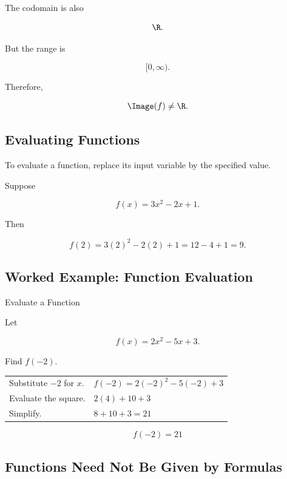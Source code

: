 The codomain is also

\[ \R. \]

But the range is

\[ [0,\infty). \]

Therefore,

\[ \Image(f)\neq\R. \]

\subsection{Evaluating Functions}
\label{subsec:evaluating-functions}

To evaluate a function, replace its input variable by the specified value.

Suppose

\[ f(x)=3x^2-2x+1. \]

Then

\[ f(2)=3(2)^2-2(2)+1=12-4+1=9. \]

\subsection{Worked Example: Function Evaluation}
\label{subsec:worked-function-evaluation}

\begin{workedexamplebox}{Evaluate a Function}

Let

\[ f(x)=2x^2-5x+3. \]

Find \(f(-2)\).

\begin{tabularx}{\textwidth}{@{}>{\raggedright\arraybackslash}p{}X@{}}
Substitute \(-2\) for \(x\). & \(f(-2)=2(-2)^2-5(-2)+3\)\\
Evaluate the square. & \(2(4)+10+3\)\\
Simplify. & \(8+10+3=21\)
\end{tabularx}

\begin{answerbox}
\[ f(-2)=21 \]
\end{answerbox}
\end{workedexamplebox}

\subsection{Functions Need Not Be Given by Formulas}
\label{subsec:functions-not-only-formulas}

